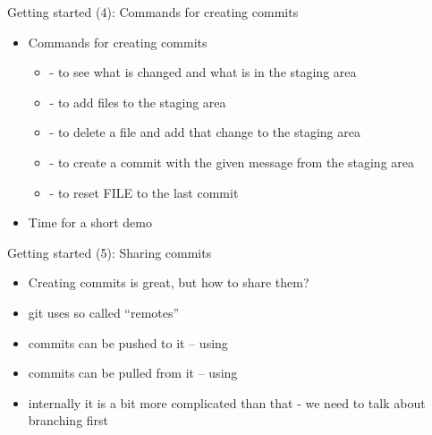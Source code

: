 \begin{frame}{Getting started (4): Commands for creating commits}
  \begin{itemize}
    \item Commands for creating commits
    \begin{itemize}
      \item {} - to see what is changed and what is in the staging area
      \item {} - to add files to the staging area
      \item {} - to delete a file and add that change to the staging area
      \item {} - to create a commit with the given message from the staging area
      \item {} - to reset FILE to the last commit
    \end{itemize}
    \item Time for a short demo
  \end{itemize}
\end{frame}

\begin{frame}{Getting started (5): Sharing commits}
  \begin{itemize}
    \item Creating commits is great, but how to share them?
    \item git uses so called ``remotes''
    \item commits can be pushed to it -- using 
    \item commits can be pulled from it -- using 
    \item internally it is a bit more complicated than that - we need to talk about branching first
  \end{itemize}
\end{frame}